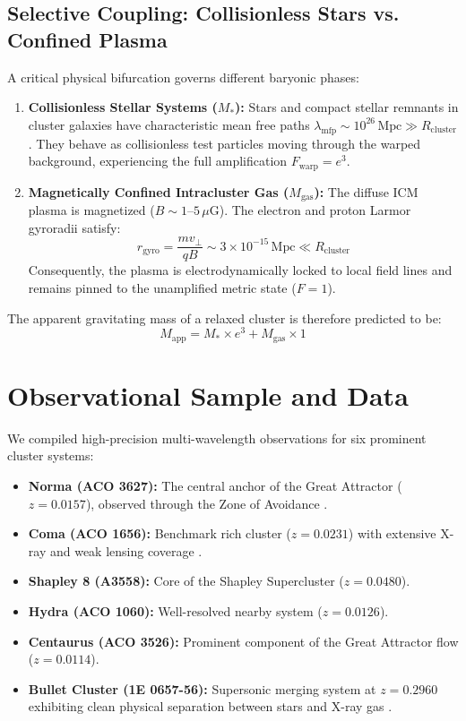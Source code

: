 \documentclass[10pt,twocolumn]{article}
\begin{document}
\subsection{Selective Coupling: Collisionless Stars vs. Confined Plasma}

A critical physical bifurcation governs different baryonic phases:
\begin{enumerate}
    \item \textbf{Collisionless Stellar Systems ($M_*$):} Stars and compact stellar remnants in cluster galaxies have characteristic mean free paths $\lambda_{\text{mfp}} \sim 10^{26}\,\text{Mpc} \gg R_{\text{cluster}}$. They behave as collisionless test particles moving through the warped background, experiencing the full amplification $F_{\text{warp}} = e^3$.
    \item \textbf{Magnetically Confined Intracluster Gas ($M_{\text{gas}}$):} The diffuse ICM plasma is magnetized ($B \sim 1\text{--}5\,\mu\text{G}$). The electron and proton Larmor gyroradii satisfy:
    \begin{equation}
        r_{\text{gyro}} = \frac{m v_\perp}{q B} \sim 3 \times 10^{-15}\,\text{Mpc} \ll R_{\text{cluster}}
    \end{equation}
    Consequently, the plasma is electrodynamically locked to local field lines and remains pinned to the unamplified metric state ($F = 1$).
\end{enumerate}

The apparent gravitating mass of a relaxed cluster is therefore predicted to be:
\begin{equation}
    M_{\text{app}} = M_* \times e^3 + M_{\text{gas}} \times 1
\end{equation}

\section{Observational Sample and Data}

We compiled high-precision multi-wavelength observations for six prominent cluster systems:
\begin{itemize}
    \item \textbf{Norma (ACO 3627):} The central anchor of the Great Attractor ($z=0.0157$), observed through the Zone of Avoidance \cite{woudt2008}.
    \item \textbf{Coma (ACO 1656):} Benchmark rich cluster ($z=0.0231$) with extensive X-ray and weak lensing coverage \cite{planck2015}.
    \item \textbf{Shapley 8 (A3558):} Core of the Shapley Supercluster ($z=0.0480$).
    \item \textbf{Hydra (ACO 1060):} Well-resolved nearby system ($z=0.0126$).
    \item \textbf{Centaurus (ACO 3526):} Prominent component of the Great Attractor flow ($z=0.0114$).
    \item \textbf{Bullet Cluster (1E 0657-56):} Supersonic merging system at $z=0.2960$ exhibiting clean physical separation between stars and X-ray gas \cite{clowe2006}.
\end{itemize}
\end{document}
